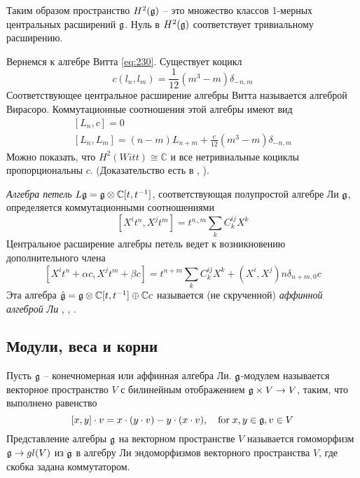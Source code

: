 Таким образом пространство $H^{2}(\mathfrak{g})$ -- это множество классов 1-мерных центральных расширений $\mathfrak{g}$. Нуль в $H^{2}(\mathfrak{g})$  соответствует тривиальному расширению. 

Вернемся к алгебре Витта \eqref{eq:230}. Существует коцикл
\begin{equation}
  \label{eq:8}
  c(l_{n},l_{m})=\frac{1}{12}(m^{3}-m)\delta_{-n,m}
\end{equation}
Соответствующее центральное расширение алгебры Витта называется алгеброй Вирасоро. Коммутационные соотношения этой алгебры имеют вид
\begin{eqnarray}
  \label{eq:9}
  [L_{n},c]=0\\
  \left[L_{n},L_{m}\right]=(n-m)L_{n+m} +\frac{c}{12} (m^{3}-m) \delta_{-n,m}
\end{eqnarray}
Можно показать, что $H^{2}(Witt)\cong \mathbb{C}$ и все нетривиальные коциклы пропорциональны $c$. 
(Доказательство есть в \cite{fuks1986cohomology}, \cite{schottenloher2008mathematical}).

{\it Алгебра петель} $L\mathfrak{g}=\mathfrak{g}\otimes \mathbb{C}[t,t^{-1}]$, соответствующая полупростой алгебре Ли $\mathfrak{g}$, определяется коммутационными соотношениями
\begin{equation}
  \label{eq:6}
  [X^{i}t^{n},X^{j}t^{m}]=t^{n_+m}\sum_{k}C^{ij}_{k}X^{k}
\end{equation}
Центральное расширение алгебры петель ведет к возникновению дополнительного члена
\begin{equation}
  \label{eq:7}
   [X^{i}t^{n}+\alpha c,X^{j}t^{m}+\beta c]=t^{n+m}\sum_{k}C^{ij}_{k}X^{k}+(X^{i},X^{j})n\delta_{n+m,0}c
\end{equation}
Эта алгебра $\hat{\mathfrak{g}}=\mathfrak{g}\otimes\mathbb{C}[t,t^{-1}]\oplus\mathbb{C}c$ называется (не скрученной)  {\it аффинной алгеброй Ли} \cite{kac1990idl}, \cite{wakimoto2001idl,wakimoto2001lectures}, \cite{kass1990ala}.

\subsection{Модули, веса и корни}
\label{sec:weights-roots}

Пусть $\mathfrak{g}$ -- конечномерная или аффинная алгебра Ли.  $\mathfrak{g}$-модулем называется векторное пространство $V$ с билинейным отображением $\mathfrak{g} \times V\to V$, таким, что выполнено равенство
\begin{equation}
  \label{eq:2}
  [x,y]\cdot v = x\cdot(y\cdot v) - y\cdot(x\cdot v), \quad \mbox{for}\; x,y\in \mathfrak{g}, v\in V
\end{equation}
Представление алгебры  $\mathfrak{g}$ на векторном пространстве $V$ называется гомоморфизм $\mathfrak{g}\to gl(V)$ из $\mathfrak{g}$ в алгебру Ли эндоморфизмов векторного пространства $V$, где скобка задана коммутатором.

